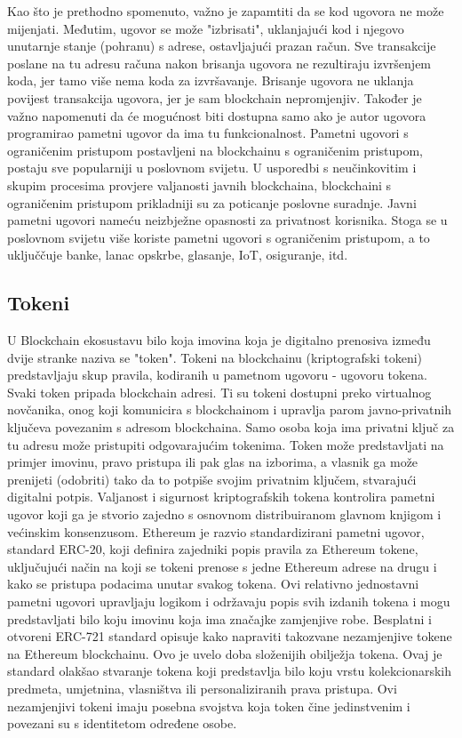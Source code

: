 \documentclass[times, utf8, diplomski]{fer}
\begin{document}
Kao što je prethodno spomenuto, važno je zapamtiti da se kod ugovora ne može mijenjati. Međutim, ugovor se može "izbrisati", uklanjajući kod i njegovo unutarnje stanje (pohranu) s adrese, ostavljajući prazan račun. Sve transakcije poslane na tu adresu računa nakon brisanja ugovora ne rezultiraju izvršenjem koda, jer tamo više nema koda za izvršavanje. Brisanje ugovora ne uklanja povijest transakcija ugovora,  jer je sam blockchain nepromjenjiv. Također je važno napomenuti da će mogućnost biti dostupna samo ako je autor ugovora programirao pametni ugovor da ima tu funkcionalnost.
Pametni ugovori s ograničenim pristupom postavljeni na blockchainu s ograničenim pristupom, postaju sve popularniji u poslovnom svijetu. U usporedbi s neučinkovitim i skupim procesima provjere valjanosti javnih blockchaina, blockchaini s ograničenim pristupom prikladniji su za poticanje poslovne suradnje. Javni pametni ugovori nameću neizbježne opasnosti za privatnost korisnika. Stoga se u poslovnom svijetu više koriste pametni ugovori s ograničenim pristupom, a to uključčuje banke, lanac opskrbe, glasanje, IoT, osiguranje, itd.

\subsection{Tokeni}

U Blockchain ekosustavu bilo koja imovina koja je digitalno prenosiva između dvije stranke naziva se "token". Tokeni na blockchainu (kriptografski tokeni) predstavljaju skup pravila, kodiranih u pametnom ugovoru - ugovoru tokena. Svaki token pripada blockchain adresi. Ti su tokeni dostupni preko virtualnog novčanika, onog koji komunicira s blockchainom i upravlja parom javno-privatnih ključeva povezanim s adresom blockchaina. Samo osoba koja ima privatni ključ za tu adresu može pristupiti odgovarajućim tokenima. Token može predstavljati na primjer imovinu, pravo pristupa ili pak glas na izborima, a vlasnik ga može prenijeti (odobriti) tako da to potpiše svojim privatnim ključem, stvarajući digitalni potpis. Valjanost i sigurnost kriptografskih tokena kontrolira pametni ugovor koji ga je stvorio zajedno s osnovnom distribuiranom glavnom knjigom i većinskim konsenzusom.
Ethereum je razvio standardizirani pametni ugovor, standard ERC-20, koji definira zajedniki popis pravila za Ethereum tokene, uključujući način na koji se tokeni prenose s jedne Ethereum adrese na drugu i kako se pristupa podacima unutar svakog tokena. Ovi relativno jednostavni pametni ugovori upravljaju logikom i održavaju popis svih izdanih tokena i mogu predstavljati bilo koju imovinu koja ima značajke zamjenjive robe.
Besplatni i otvoreni ERC-721 standard opisuje kako napraviti takozvane nezamjenjive tokene na Ethereum blockchainu. Ovo je uvelo doba složenijih obilježja tokena.  Ovaj je standard olakšao stvaranje tokena koji predstavlja bilo koju vrstu kolekcionarskih predmeta, umjetnina, vlasništva ili personaliziranih prava pristupa. Ovi nezamjenjivi tokeni imaju posebna svojstva koja token čine jedinstvenim i povezani su s identitetom određene osobe.
\end{document}
